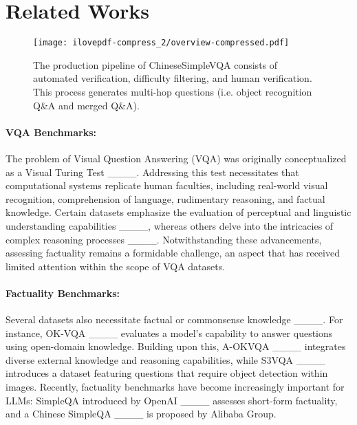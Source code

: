 \section{Related Works}
\begin{figure*}[t]
\begin{center}
\texttt{[image: ilovepdf-compress\_2/overview-compressed.pdf]}
\caption{The production pipeline of ChineseSimpleVQA consists of automated verification, difficulty filtering, and human verification. This process generates multi-hop questions (i.e. object recognition Q\&A and merged Q\&A).}
\label{fig.method}
\end{center}
\vspace{-0.6cm}
\end{figure*}

\paragraph{VQA Benchmarks:}
The problem of Visual Question Answering (VQA) was originally conceptualized as a Visual Turing Test ____. Addressing this test necessitates that computational systems replicate human faculties, including real-world visual recognition, comprehension of language, rudimentary reasoning, and factual knowledge. Certain datasets emphasize the evaluation of perceptual and linguistic understanding capabilities ____, whereas others delve into the intricacies of complex reasoning processes ____. Notwithstanding these advancements, assessing factuality remains a formidable challenge, an aspect that has received limited attention within the scope of VQA datasets.

\paragraph{Factuality Benchmarks:}
Several datasets also necessitate factual or commonsense knowledge ____. For instance, OK-VQA ____ evaluates a model's capability to answer questions using open-domain knowledge. Building upon this, A-OKVQA ____ integrates diverse external knowledge and reasoning capabilities, while S3VQA ____ introduces a dataset featuring questions that require object detection within images. Recently, factuality benchmarks have become increasingly important for LLMs: SimpleQA introduced by OpenAI ____ assesses short-form factuality, and a Chinese SimpleQA ____ is proposed by Alibaba Group. 


